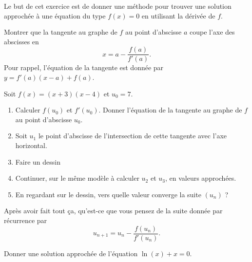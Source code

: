 
\begin{exercice}\label{exosmath-0461}

    Le but de cet exercice est de donner une méthode pour trouver une solution approchée à une équation du type \( f(x)=0\) en utilisant la dérivée de \( f\).

    Montrer que la tangente au graphe de \( f\) au point d'abscisse \( a\) coupe l'axe des abscisses en 
    \begin{equation}
        x=a-\frac{ f(a) }{ f'(a) }.
    \end{equation}
    Pour rappel, l'équation de la tangente est donnée par \( y=f'(a)(x-a)+f(a)\).

    Soit \( f(x)=(x+3)(x-4)\) et \( u_0=7\).
    \begin{enumerate}
        \item
            Calculer \( f(u_0)\) et \( f'(u_0)\). Donner l'équation de la tangente au graphe de \( f\) au point d'abscisse \( u_0\).
        \item 
            Soit \( u_1\) le point d'abscisse de l'intersection de cette tangente avec l'axe horizontal.
        \item
            Faire un dessin
        \item
            Continuer, sur le même modèle à calculer \( u_2\) et \( u_3\), en valeurs approchées.
        \item
            En regardant sur le dessin, vers quelle valeur converge la suite \( (u_n)\) ?
    \end{enumerate}

    Après avoir fait tout ça, qu'est-ce que vous pensez de la suite donnée par récurrence par
    \begin{equation}
        u_{n+1}=u_n-\frac{ f(u_n) }{ f'(u_n) }.
    \end{equation}

    Donner une solution approchée de l'équation $\ln(x)+x=0$.

\end{exercice}
